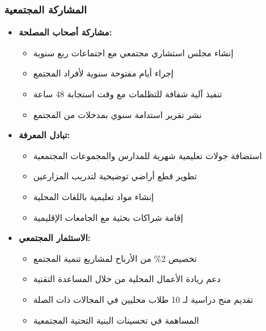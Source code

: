 \subsubsection{المشاركة المجتمعية}
\begin{itemize}
    \item \textbf{مشاركة أصحاب المصلحة:}
    \begin{itemize}
        \item إنشاء مجلس استشاري مجتمعي مع اجتماعات ربع سنوية
        \item إجراء أيام مفتوحة سنوية لأفراد المجتمع
        \item تنفيذ آلية شفافة للتظلمات مع وقت استجابة 48 ساعة
        \item نشر تقرير استدامة سنوي بمدخلات من المجتمع
    \end{itemize}
    
    \item \textbf{تبادل المعرفة:}
    \begin{itemize}
        \item استضافة جولات تعليمية شهرية للمدارس والمجموعات المجتمعية
        \item تطوير قطع أراضي توضيحية لتدريب المزارعين
        \item إنشاء مواد تعليمية باللغات المحلية
        \item إقامة شراكات بحثية مع الجامعات الإقليمية
    \end{itemize}
    
    \item \textbf{الاستثمار المجتمعي:}
    \begin{itemize}
        \item تخصيص 2\% من الأرباح لمشاريع تنمية المجتمع
        \item دعم ريادة الأعمال المحلية من خلال المساعدة التقنية
        \item تقديم منح دراسية لـ 10 طلاب محليين في المجالات ذات الصلة
        \item المساهمة في تحسينات البنية التحتية المجتمعية
    \end{itemize}
\end{itemize}

